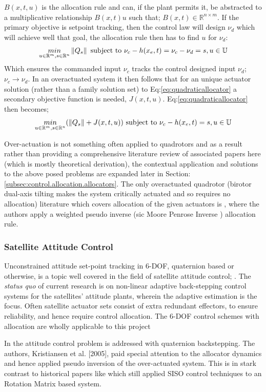 $B(x,t,u)$ is the allocation rule and can, if the plant permits it, be abstracted to a multiplicative relationship $B(x,t)u$ such that; $B(x,t)\in\mathbb{R}^{n\times m}$. If the primary objective is setpoint tracking, then the control law will design $\nu_d$ which will achieve well that goal, the allocation rule then has to find $u$ for $\nu_d$:
\begin{equation}\label{eq:quadraticallocator}
\underset{u \in \mathbb{R}^m ,s \in \mathbb{R}^n}{min}\left\lVert Q_s\right\rVert ~\text{subject to} ~\nu_c - h(x_e,t)=\nu_c-\nu_d=s, u \in \mathbb{U}
\end{equation}
Which ensures the commanded input $\nu_c$ tracks the control designed input $\nu_d$; $\nu_c\rightarrow\nu_d$. In an overactuated system it then follows that for an unique actuator solution (rather than a family solution set) to Eq:\ref{eq:quadraticallocator} a secondary objective function is needed, $J(x,t,u)$. Eq:\ref{eq:quadraticallocator} then becomes;
\begin{equation}
\underset{u \in \mathbb{R}^m ,s \in \mathbb{R}^n}{min}(\left\lVert Q_s\right\rVert+J(x,t,u)) ~\text{subject to} ~\nu_c - h(x_e,t)=s, u \in \mathbb{U}
\end{equation}
\par
Over-actuation is not something often applied to quadrotors and as a result rather than providing a comprehensive literature review of associated papers here (which is mostly theoretical derivation), the contextual application and solutions to the above posed problems are expanded later in Section: \ref{subsec:control.allocation.allocators}. The only overactuated quadrotor (birotor dual-axis tilting makes the system critically actuated and so requires no allocation) literature which covers allocation of the given actuators is \cite{tiltgasco,tiltrihani}, where the authors apply a weighted pseudo inverse (sic Moore Penrose Inverse \cite{moorepenrose}) allocation rule.
\subsubsection*{Satellite Attitude Control}
Unconstrained attitude set-point tracking in 6-DOF, quaternion based or otherwise, is a topic well covered in the field of satellite attitude control; \cite{}. The \emph{status quo} of current research is on non-linear adaptive back-stepping control systems for the satellites' attitude plants, wherein the adaptive estimation is the focus. Often satellite actuator sets consist of extra redundant effectors, to ensure reliability, and hence require control allocation. The 6-DOF control schemes with allocation are wholly applicable to this project
\par
In \cite{satellitebackstepping} the attitude control problem is addressed with quaternion backstepping. The authors, Kristiansen et al. [2005], paid special attention to the allocator dynamics and hence applied pseudo inversion of the over-actuated system. This is in stark contrast to historical papers like \cite{} which still applied SISO control techniques to an Rotation Matrix based system.
